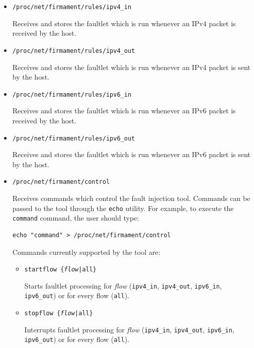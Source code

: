 \documentclass[11pt]{article}
\begin{document}
\begin{itemize}


\item \texttt{/proc/net/firmament/rules/ipv4\_in}

Receives and stores the faultlet which is run whenever an IPv4 packet is received by the host.

\item \texttt{/proc/net/firmament/rules/ipv4\_out}


Receives and stores the faultlet which is run whenever an IPv4 packet is sent by the host.

\item \texttt{/proc/net/firmament/rules/ipv6\_in}


Receives and stores the faultlet which is run whenever an IPv6 packet is received by the host.

\item \texttt{/proc/net/firmament/rules/ipv6\_out}

Receives and stores the faultlet which is run whenever an IPv6 packet is sent by the host.




\item \texttt{/proc/net/firmament/control}

Receives commands which control the fault injection tool. Commands can be passed to the tool through the \texttt{echo} utility. For example, to execute the \texttt{command} command, the user should type:

\begin{verbatim}
echo "command" > /proc/net/firmament/control
\end{verbatim}

Commands currently supported by the tool are:

\begin{itemize}

\item \texttt{startflow \{{\em flow}|all\}}



Starts faultlet processing for {\em flow} (\texttt{ipv4\_in}, \texttt{ipv4\_out}, \texttt{ipv6\_in}, \texttt{ipv6\_out}) or for every flow (\texttt{all}).

\item \texttt{stopflow \{{\em flow}|all\}}

Interrupts faultlet processing for {\em flow} (\texttt{ipv4\_in}, \texttt{ipv4\_out}, \texttt{ipv6\_in}, \texttt{ipv6\_out}) or for every flow (\texttt{all}).





\end{itemize}
\end{itemize}
\end{document}
